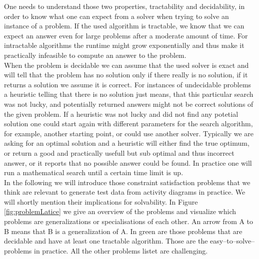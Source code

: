 One needs to understand those two properties, tractability and decidability, in order to know what one can expect from a solver when trying to solve an instance of a problem. If the used algorithm is tractable, we know that we can expect an answer even for large problems after a moderate amount of time. For intractable algorithms the runtime might grow exponentially and thus make it practically infeasible to compute an answer to the problem.\\
When the problem is decidable we can assume that the used solver is exact and will tell that the problem has no solution only if there really is no solution, if it returns a solution we assume it is correct. For instances of undecidable problems a heuristic telling that there is no solution just means, that this particular search was not lucky, and potentially returned answers might not be correct solutions of the given problem. If a heuristic was not lucky and did not find any potetial solution one could start again with different parameters for the search algorithm, for example, another starting point, or could use another solver. Typically we are asking for an optimal solution and a heuristic will either find the true optimum, or return a good and practically usefull but sub optimal and thus incorrect answer, or it reports that no possible answer could be found. In practice one will run a mathematical search until a certain time limit is up.\\
In the following we will introduce those constraint satisfaction problems that we think are relevant to generate test data from activity diagrams in practice. We will shortly mention their implications for solvability. In Figure \ref{fig:problemLatice} we give an overview of the problems and visualize which problems are generalizations or specialisations of each other. An arrow from A to B means that B is a generalization of A. In green are those problems that are decidable and have at least one tractable algorithm. Those are the easy--to--solve--problems in practice. All the other problems listet are challenging.
